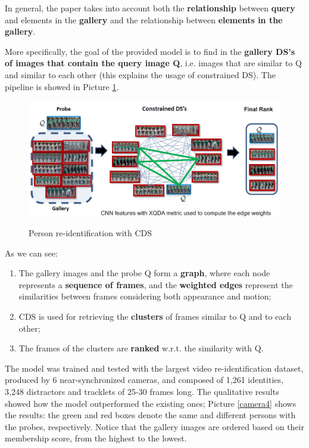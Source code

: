 In general, the paper takes into account both the \textbf{relationship} between \textbf{query} and elements in the \textbf{gallery} and the relationship between \textbf{elements in the gallery}.

More specifically, the goal of the provided model is to find in the \textbf{gallery DS's of images that contain the query image Q}, i.e. images that are similar to Q and similar to each other (this explains the usage of constrained DS). The pipeline is showed in Picture \ref{camera3}.

\begin{figure}[h!]
    \centering
    \includegraphics[scale = 1.4]{img/camera3.jpg}
    \label{camera3}
    \caption{Person re-identification with CDS}
\end{figure}

As we can see:

\begin{enumerate}
    \item The gallery images and the probe Q form a \textbf{graph}, where each node represents a \textbf{sequence of frames}, and the \textbf{weighted edges} represent the similarities between frames considering both appearance and motion;
    \item CDS is used for retrieving the \textbf{clusters} of frames similar to Q and to each other;
    \item The frames of the clusters are \textbf{ranked} w.r.t. the similarity with Q.
\end{enumerate}

The model was trained and tested with the largest video re-identification dataset, produced by 6 near-synchronized cameras, and composed of 1,261 identities, 3,248 distractors and tracklets of 25-30 frames long. The qualitative results showed how the model outperformed the existing ones; Picture \ref{camera4} shows the results: the green and red boxes denote the same and different persons with the probes, respectively. Notice that the gallery images are ordered based on their membership score, from the highest to the lowest.

